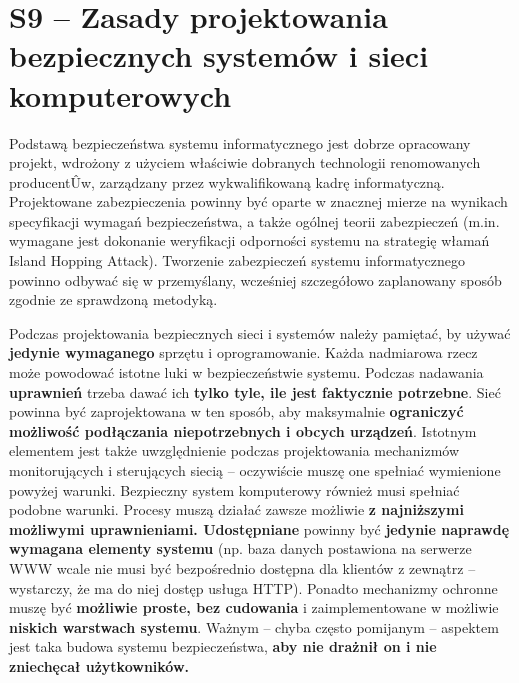 \section{S9 -- Zasady projektowania bezpiecznych systemów i sieci komputerowych}

Podstawą bezpieczeństwa systemu informatycznego jest dobrze opracowany projekt, wdrożony z użyciem właściwie dobranych technologii renomowanych producentÛw, zarządzany przez wykwalifikowaną kadrę informatyczną. Projektowane zabezpieczenia powinny być oparte w znacznej mierze na wynikach specyfikacji wymagań bezpieczeństwa, a także ogólnej teorii zabezpieczeń (m.in. wymagane jest dokonanie weryfikacji odporności systemu na strategię włamań Island Hopping Attack). Tworzenie zabezpieczeń systemu informatycznego powinno odbywać się w przemyślany, wcześniej szczegółowo zaplanowany sposób zgodnie ze sprawdzoną metodyką. 

Podczas projektowania bezpiecznych sieci i systemów należy pamiętać, by używać \textbf{jedynie wymaganego} sprzętu i oprogramowanie. Każda nadmiarowa rzecz może powodować istotne luki w bezpieczeństwie systemu. Podczas nadawania \textbf{uprawnień} trzeba dawać ich \textbf{tylko tyle, ile jest faktycznie potrzebne}. Sieć powinna być zaprojektowana w ten sposób, aby maksymalnie \textbf{ograniczyć możliwość podłączania niepotrzebnych i obcych urządzeń}. Istotnym elementem jest także uwzględnienie podczas projektowania mechanizmów monitorujących i sterujących siecią – oczywiście muszę one spełniać wymienione powyżej warunki. Bezpieczny system komputerowy również musi spełniać podobne warunki. Procesy muszą działać zawsze możliwie \textbf{z najniższymi możliwymi uprawnieniami. Udostępniane} powinny być \textbf{jedynie naprawdę wymagana elementy systemu} (np. baza danych postawiona na serwerze WWW wcale nie musi być bezpośrednio dostępna dla klientów z zewnątrz – wystarczy, że ma do niej dostęp usługa HTTP). Ponadto mechanizmy ochronne muszę być \textbf{możliwie proste, bez cudowania} i zaimplementowane w możliwie \textbf{niskich warstwach systemu}. Ważnym – chyba często pomijanym – aspektem jest taka budowa systemu bezpieczeństwa, \textbf{aby nie drażnił on i nie zniechęcał użytkowników.}
